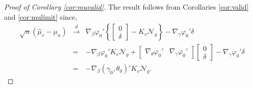 \begin{proof}[Proof of Corollary \ref{cor:muvalid}]
The result follows from Corollaries \ref{cor:valid} and \ref{cor:mulimit} since,
	\begin{eqnarray*}
		\sqrt{n}\left( \widehat{\mu}_v - \mu_n\right) &\overset{d}{\rightarrow}&\nabla_\beta\varphi_0' \left\{ \left[\begin{array}{c} 0\\ \delta \end{array}\right] -K_v\mathscr{N}_g  \right\}-\nabla_\gamma \varphi_0' \delta\\ 
			&=& -\nabla_\beta\varphi_0' K_v\mathscr{N}_g + \left[\begin{array}{cc} \nabla_\theta\varphi_0'  & \nabla_\gamma\varphi_0' \end{array}\right]\left[\begin{array}{c} 0\\ \delta\end{array}\right]-\nabla_\gamma \varphi_0' \delta\\
			&=& -\nabla_\beta(\gamma_0,\theta_0)' K_v\mathscr{N}_g.
	\end{eqnarray*}
\end{proof}


